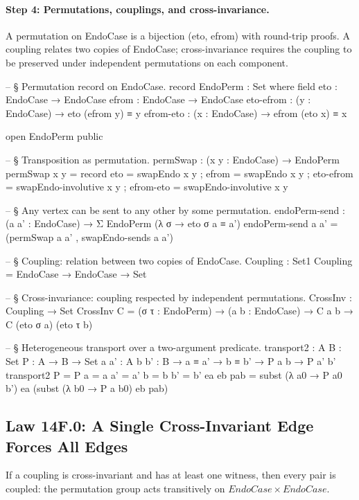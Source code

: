 \documentclass[11pt,a4paper]{book}
\def\mathrm#1{#1}%
\def\texttt#1{#1}%
\begin{document}
\paragraph{Step 4: Permutations, couplings, and cross-invariance.}
A permutation on \texttt{EndoCase} is a bijection \texttt{(eto, efrom)} with round-trip proofs.
A coupling relates two copies of \texttt{EndoCase}; cross-invariance requires the coupling to be preserved under independent permutations on each component.

\begin{code}
-- § Permutation record on EndoCase.
record EndoPerm : Set where
  field
    eto       : EndoCase → EndoCase
    efrom     : EndoCase → EndoCase
    eto-efrom : (y : EndoCase) → eto (efrom y) ≡ y
    efrom-eto : (x : EndoCase) → efrom (eto x) ≡ x

open EndoPerm public

-- § Transposition as permutation.
permSwap : (x y : EndoCase) → EndoPerm
permSwap x y = record
  { eto = swapEndo x y
  ; efrom = swapEndo x y
  ; eto-efrom = swapEndo-involutive x y
  ; efrom-eto = swapEndo-involutive x y
  }

-- § Any vertex can be sent to any other by some permutation.
endoPerm-send : (a a' : EndoCase) → Σ EndoPerm (λ σ → eto σ a ≡ a')
endoPerm-send a a' = (permSwap a a' , swapEndo-sends a a')

-- § Coupling: relation between two copies of EndoCase.
Coupling : Set1
Coupling = EndoCase → EndoCase → Set

-- § Cross-invariance: coupling respected by independent permutations.
CrossInv : Coupling → Set
CrossInv C = (σ τ : EndoPerm) → (a b : EndoCase) → C a b → C (eto σ a) (eto τ b)

-- § Heterogeneous transport over a two-argument predicate.
transport2 : {A B : Set} {P : A → B → Set} {a a' : A} {b b' : B} → a ≡ a' → b ≡ b' → P a b → P a' b'
transport2 {P = P} {a = a} {a' = a'} {b = b} {b' = b'} ea eb pab =
  subst (λ a0 → P a0 b') ea (subst (λ b0 → P a b0) eb pab)
\end{code}

\subsection{Law 14F.0: A Single Cross-Invariant Edge Forces All Edges}

If a coupling is cross-invariant and has at least one witness, then every pair is coupled:
the permutation group acts transitively on $\mathrm{EndoCase} \times \mathrm{EndoCase}$.
\end{document}

